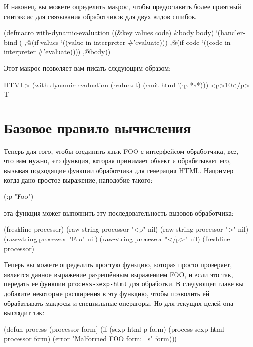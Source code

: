 И наконец, вы можете определить макрос, чтобы предоставить более приятный синтаксис для
связывания обработчиков для двух видов ошибок.

\begin{myverb}
(defmacro with-dynamic-evaluation ((&key values code) &body body)
  `(handler-bind (
       ,@(if values `((value-in-interpreter #'evaluate)))
       ,@(if code `((code-in-interpreter #'evaluate))))
     ,@body))
\end{myverb}

Этот макрос позволяет вам писать следующим образом: 

\begin{myverb}
HTML> (with-dynamic-evaluation (:values t) (emit-html '(:p *x*)))
<p>10</p>
T
\end{myverb}


\section{Базовое правило вычисления}

Теперь для того, чтобы соединить язык FOO с интерфейсом обработчика, все, что вам нужно,
это функция, которая принимает объект и обрабатывает его, вызывая подходящие функции
обработчика для генерации HTML. Например, когда дано простое выражение, наподобие такого:

\begin{myverb}
  (:p "Foo")
\end{myverb}

эта функция может выполнить эту последовательность вызовов обработчика:

\begin{myverb}
(freshline processor)
(raw-string processor "<p" nil)
(raw-string processor ">" nil)
(raw-string processor "Foo" nil)
(raw-string processor "</p>" nil)
(freshline processor)
\end{myverb}

Теперь вы можете определить простую функцию, которая просто проверяет, является данное
выражение разрешённым выражением FOO, и если это так, передать её функции
\lstinline{process-sexp-html} для обработки. В следующей главе вы добавите некоторые расширения
в эту функцию, чтобы позволить ей обрабатывать макросы и специальные операторы. Но для
текущих целей она выглядит так:

\begin{myverb}
(defun process (processor form)
  (if (sexp-html-p form)
    (process-sexp-html processor form)
    (error "Malformed FOO form: ~s" form)))
\end{myverb}

